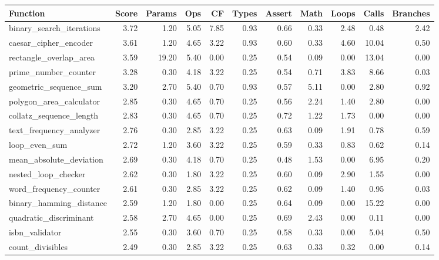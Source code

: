 \begin{table}[h]
\centering
\scriptsize
\begin{adjustbox}{max width=\textwidth}
\begin{tabular}{lrrrrrrrrrr}
\toprule
\textbf{Function} & \textbf{Score} & \textbf{Params} & \textbf{Ops} & \textbf{CF} & \textbf{Types} & \textbf{Assert} & \textbf{Math} & \textbf{Loops} & \textbf{Calls} & \textbf{Branches} \\
\midrule
binary\_search\_iterations & 3.72 & 1.20 & 5.05 & 7.85 & 0.93 & 0.66 & 0.33 & 2.48 & 0.48 & 2.42 \\
caesar\_cipher\_encoder & 3.61 & 1.20 & 4.65 & 3.22 & 0.93 & 0.60 & 0.33 & 4.60 & 10.04 & 0.50 \\
rectangle\_overlap\_area & 3.59 & 19.20 & 5.40 & 0.00 & 0.25 & 0.54 & 0.09 & 0.00 & 13.04 & 0.00 \\
prime\_number\_counter & 3.28 & 0.30 & 4.18 & 3.22 & 0.25 & 0.54 & 0.71 & 3.83 & 8.66 & 0.03 \\
geometric\_sequence\_sum & 3.20 & 2.70 & 5.40 & 0.70 & 0.93 & 0.57 & 5.11 & 0.00 & 2.80 & 0.92 \\
polygon\_area\_calculator & 2.85 & 0.30 & 4.65 & 0.70 & 0.25 & 0.56 & 2.24 & 1.40 & 2.80 & 0.00 \\
collatz\_sequence\_length & 2.83 & 0.30 & 4.65 & 0.70 & 0.25 & 0.72 & 1.22 & 1.73 & 0.00 & 0.00 \\
text\_frequency\_analyzer & 2.76 & 0.30 & 2.85 & 3.22 & 0.25 & 0.63 & 0.09 & 1.91 & 0.78 & 0.59 \\
loop\_even\_sum & 2.72 & 1.20 & 3.60 & 3.22 & 0.25 & 0.59 & 0.33 & 0.83 & 0.62 & 0.14 \\
mean\_absolute\_deviation & 2.69 & 0.30 & 4.18 & 0.70 & 0.25 & 0.48 & 1.53 & 0.00 & 6.95 & 0.20 \\
nested\_loop\_checker & 2.62 & 0.30 & 1.80 & 3.22 & 0.25 & 0.60 & 0.09 & 2.90 & 1.55 & 0.00 \\
word\_frequency\_counter & 2.61 & 0.30 & 2.85 & 3.22 & 0.25 & 0.62 & 0.09 & 1.40 & 0.95 & 0.03 \\
binary\_hamming\_distance & 2.59 & 1.20 & 1.80 & 0.00 & 0.25 & 0.64 & 0.09 & 0.00 & 15.22 & 0.00 \\
quadratic\_discriminant & 2.58 & 2.70 & 4.65 & 0.00 & 0.25 & 0.69 & 2.43 & 0.00 & 0.11 & 0.00 \\
isbn\_validator & 2.55 & 0.30 & 3.60 & 0.70 & 0.25 & 0.58 & 0.33 & 0.00 & 5.04 & 0.50 \\
count\_divisibles & 2.49 & 0.30 & 2.85 & 3.22 & 0.25 & 0.63 & 0.33 & 0.32 & 0.00 & 0.14 \\

\end{tabular}
\end{adjustbox}
\end{table}
